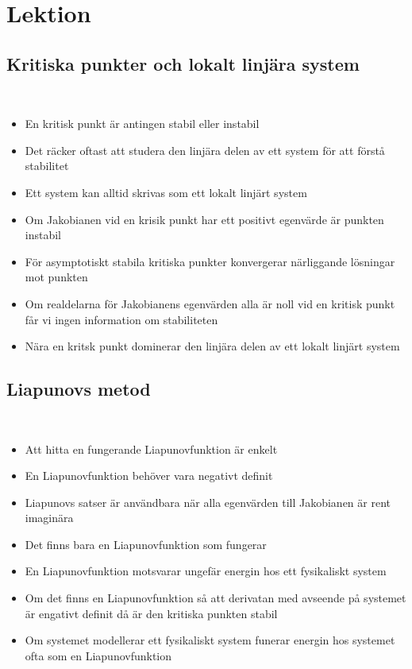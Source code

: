 \section{Lektion}
\par\bigskip
\subsection{Kritiska punkter och lokalt linjära system}\hfill\\

\begin{itemize}
  \item En kritisk punkt är antingen stabil eller instabil
  \item Det räcker oftast att studera den linjära delen av ett system för att förstå stabilitet
  \item Ett system kan alltid skrivas som ett lokalt linjärt system
  \item Om Jakobianen vid en krisik punkt har ett positivt egenvärde är punkten instabil
  \item För asymptotiskt stabila kritiska punkter konvergerar närliggande lösningar mot punkten
  \item Om realdelarna för Jakobianens egenvärden alla är noll vid en kritisk punkt får vi ingen information om stabiliteten

  \item Nära en kritsk punkt dominerar den linjära delen av ett lokalt linjärt system
\end{itemize}
\par\bigskip
\subsection{Liapunovs metod}\hfill\\
\begin{itemize}
  \item Att hitta en fungerande Liapunovfunktion är enkelt
  \item En Liapunovfunktion behöver vara negativt definit
  \item Liapunovs satser är användbara när alla egenvärden till Jakobianen är rent imaginära
  \item Det finns bara en Liapunovfunktion som fungerar
  \item En Liapunovfunktion motsvarar ungefär energin hos ett fysikaliskt system
  \item Om det finns en Liapunovfunktion så att derivatan med avseende på systemet är engativt definit då är den kritiska punkten stabil
  \item Om systemet modellerar ett fysikaliskt system funerar energin hos systemet ofta som en Liapunovfunktion
\end{itemize}
\par\bigskip
